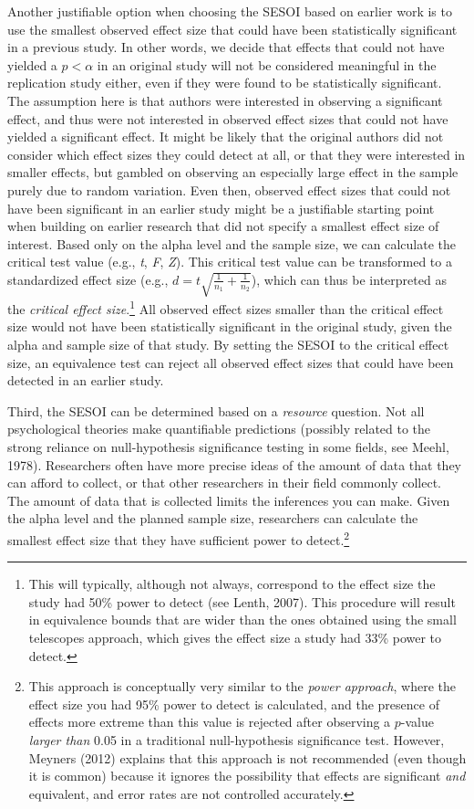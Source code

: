 \documentclass[english,floatsintext,man]{apa6}
\newcounter{author}
\theoremstyle{definition}
\theoremstyle{definition}
\theoremstyle{definition}
\theoremstyle{remark}
\begin{document}
Another justifiable option when choosing the SESOI based on earlier work
is to use the smallest observed effect size that could have been
statistically significant in a previous study. In other words, we decide
that effects that could not have yielded a \(p < \alpha\) in an original
study will not be considered meaningful in the replication study either,
even if they were found to be statistically significant. The assumption
here is that authors were interested in observing a significant effect,
and thus were not interested in observed effect sizes that could not
have yielded a significant effect. It might be likely that the original
authors did not consider which effect sizes they could detect at all, or
that they were interested in smaller effects, but gambled on observing
an especially large effect in the sample purely due to random variation.
Even then, observed effect sizes that could not have been significant in
an earlier study might be a justifiable starting point when building on
earlier research that did not specify a smallest effect size of
interest. Based only on the alpha level and the sample size, we can
calculate the critical test value (e.g., \emph{t}, \emph{F}, \emph{Z}).
This critical test value can be transformed to a standardized effect
size (e.g.,
\(d = t \sqrt { \frac { 1} { n _ { 1} } + \frac { 1} { n _ { 2} } }\)),
which can thus be interpreted as the \emph{critical effect
size}.\footnote{This will typically, although not always, correspond to
  the effect size the study had 50\% power to detect (see Lenth, 2007).
  This procedure will result in equivalence bounds that are wider than
  the ones obtained using the small telescopes approach, which gives the
  effect size a study had 33\% power to detect.} All observed effect
sizes smaller than the critical effect size would not have been
statistically significant in the original study, given the alpha and
sample size of that study. By setting the SESOI to the critical effect
size, an equivalence test can reject all observed effect sizes that
could have been detected in an earlier study.

Third, the SESOI can be determined based on a \emph{resource} question.
Not all psychological theories make quantifiable predictions (possibly
related to the strong reliance on null-hypothesis significance testing
in some fields, see Meehl, 1978). Researchers often have more precise
ideas of the amount of data that they can afford to collect, or that
other researchers in their field commonly collect. The amount of data
that is collected limits the inferences you can make. Given the alpha
level and the planned sample size, researchers can calculate the
smallest effect size that they have sufficient power to
detect.\footnote{This approach is conceptually very similar to the
  \emph{power approach}, where the effect size you had 95\% power to
  detect is calculated, and the presence of effects more extreme than
  this value is rejected after observing a \(p\)-value \emph{larger
  than} 0.05 in a traditional null-hypothesis significance test.
  However, Meyners (2012) explains that this approach is not recommended
  (even though it is common) because it ignores the possibility that
  effects are significant \emph{and} equivalent, and error rates are not
  controlled accurately.}
\end{document}
